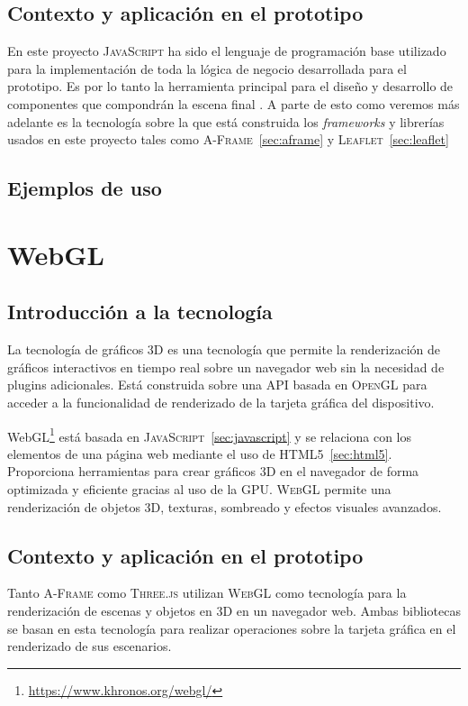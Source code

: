 \documentclass[a4paper, 11pt]{book}
\begin{document}
\subsection{Contexto y aplicación en el prototipo}
En este proyecto \textsc{JavaScript} ha sido el lenguaje de programación base utilizado para la implementación de toda la lógica de negocio desarrollada para el prototipo. Es por lo tanto la herramienta principal para el diseño y desarrollo de componentes que compondrán la escena final . A parte de esto como veremos más adelante es la tecnología sobre la que está construida los \emph{\gls{framework}s} y librerías usados en este proyecto tales como \textsc{A-Frame}~\ref{sec:aframe} y \textsc{Leaflet}~\ref{sec:leaflet}
\subsection{Ejemplos de uso}

\section{WebGL}
\label{sec:webgl}
\subsection{Introducción a la tecnología}
La tecnología de gráficos \textsc{\gls{3D}} es una tecnología que permite la \gls{renderización} de gráficos interactivos en tiempo real sobre un navegador web sin la necesidad de plugins adicionales. Está construida sobre una \textsc{\gls{API}} basada en \textsc{\gls{OpenGL}} para acceder a la funcionalidad de renderizado de la tarjeta gráfica del dispositivo.

WebGL\footnote{\url{https://www.khronos.org/webgl/}} está basada en \textsc{JavaScript}~\ref{sec:javascript} y se relaciona con los elementos de una página web mediante el uso de \textsc{HTML5}~\ref{sec:html5}. 
Proporciona herramientas para crear gráficos \textsc{3D} en el navegador de forma optimizada y eficiente gracias al uso de la \gls{GPU}. \textsc{WebGL} permite una renderización de objetos 3D, texturas, sombreado y efectos visuales avanzados.
\subsection{Contexto y aplicación en el prototipo}
Tanto \textsc{A-Frame} como \textsc{Three.js} utilizan \textsc{WebGL} como tecnología para la renderización de escenas y objetos en \textsc{3D} en un navegador web. Ambas bibliotecas se basan en esta tecnología para realizar operaciones sobre la tarjeta gráfica en el renderizado de sus escenarios.
\end{document}
